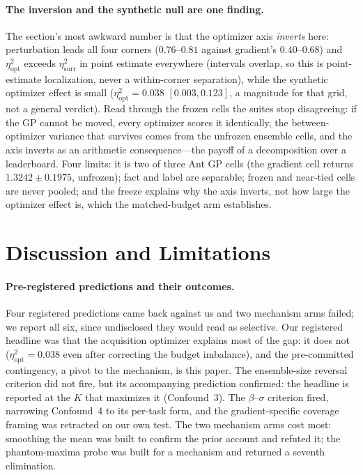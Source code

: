 \documentclass[letterpaper]{article} %
\theoremstyle{plain}
\newcommand{\mdemph}[1]{\emph{#1}}
\begin{document}
\paragraph{The inversion and the synthetic null are one finding.} The section's most awkward number is that the optimizer axis \mdemph{inverts} here: perturbation leads all four corners ($0.76$--$0.81$ against gradient's $0.40$--$0.68$) and $\eta^2_{\text{opt}}$ exceeds $\eta^2_{\text{surr}}$ in point estimate everywhere (intervals overlap, so this is point-estimate localization, never a within-corner separation), while the synthetic optimizer effect is small ($\eta^2_{\text{opt}}{=}0.038$ $[0.003,0.123]$, a magnitude for that grid, not a general verdict). Read through the frozen cells the suites stop disagreeing: if the GP cannot be moved, every optimizer scores it identically, the between-optimizer variance that survives comes from the unfrozen ensemble cells, and the axis inverts as an arithmetic consequence---the payoff of a decomposition over a leaderboard. Four limits: it is two of three Ant GP cells (the gradient cell returns $1.3242 \pm 0.1975$, unfrozen); fact and label are separable; frozen and near-tied cells are never pooled; and the freeze explains why the axis inverts, not how large the optimizer effect is, which the matched-budget arm establishes.

\section{Discussion and Limitations}
\label{sec:limits}

\paragraph{Pre-registered predictions and their outcomes.} Four registered predictions came back against us and two mechanism arms failed; we report all six, since undisclosed they would read as selective. Our registered headline was that the acquisition optimizer explains most of the gap: it does not ($\eta^2_{\text{opt}}{=}0.038$ even after correcting the budget imbalance), and the pre-committed contingency, a pivot to the mechanism, is this paper. The ensemble-size reversal criterion did not fire, but its accompanying prediction confirmed: the headline is reported at the $K$ that maximizes it (Confound~3). The $\beta$--$\sigma$ criterion fired, narrowing Confound~4 to its per-task form, and the gradient-specific coverage framing was retracted on our own test. The two mechanism arms cost most: smoothing the mean was built to confirm the prior account and refuted it; the phantom-maxima probe was built for a mechanism and returned a seventh elimination.
\end{document}

